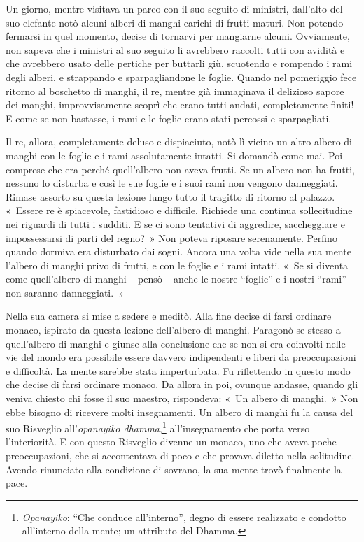 Un giorno, mentre visitava un parco con il suo seguito di ministri,
dall'alto del suo elefante notò alcuni alberi di manghi carichi di
frutti maturi. Non potendo fermarsi in quel momento, decise di tornarvi
per mangiarne alcuni. Ovviamente, non sapeva che i ministri al suo
seguito li avrebbero raccolti tutti con avidità e che avrebbero usato
delle pertiche per buttarli giù, scuotendo e rompendo i rami degli
alberi, e strappando e sparpagliandone le foglie. Quando nel pomeriggio
fece ritorno al boschetto di manghi, il re, mentre già immaginava il
delizioso sapore dei manghi, improvvisamente scoprì che erano tutti
andati, completamente finiti! E come se non bastasse, i rami e le foglie
erano stati percossi e sparpagliati.

Il re, allora, completamente deluso e dispiaciuto, notò lì vicino un
altro albero di manghi con le foglie e i rami assolutamente intatti. Si
domandò come mai. Poi comprese che era perché quell'albero non aveva
frutti. Se un albero non ha frutti, nessuno lo disturba e così le sue
foglie e i suoi rami non vengono danneggiati. Rimase assorto su questa
lezione lungo tutto il tragitto di ritorno al palazzo. «~Essere re è
spiacevole, fastidioso e difficile. Richiede una continua sollecitudine
nei riguardi di tutti i sudditi. E se ci sono tentativi di aggredire,
saccheggiare e impossessarsi di parti del regno?~» Non poteva riposare
serenamente. Perfino quando dormiva era disturbato dai sogni. Ancora una
volta vide nella sua mente l'albero di manghi privo di frutti, e con le
foglie e i rami intatti. «~Se si diventa come quell'albero di manghi --
pensò -- anche le nostre ``foglie'' e i nostri ``rami'' non saranno
danneggiati.~»

Nella sua camera si mise a sedere e meditò. Alla fine decise di farsi
ordinare monaco, ispirato da questa lezione dell'albero di manghi.
Paragonò se stesso a quell'albero di manghi e giunse alla conclusione
che se non si era coinvolti nelle vie del mondo era possibile essere
davvero indipendenti e liberi da preoccupazioni e difficoltà. La mente
sarebbe stata imperturbata. Fu riflettendo in questo modo che decise di
farsi ordinare monaco. Da allora in poi, ovunque andasse, quando gli
veniva chiesto chi fosse il suo maestro, rispondeva: «~Un albero di
manghi.~» Non ebbe bisogno di ricevere molti insegnamenti. Un albero di
manghi fu la causa del suo Risveglio all'\emph{opanayiko
dhamma},\footnote{\emph{Opanayiko}: ``Che conduce all'interno'', degno
  di essere realizzato e condotto all'interno della mente; un attributo
  del Dhamma.} all'insegnamento che porta verso l'interiorità. E con
questo Risveglio divenne un monaco, uno che aveva poche preoccupazioni,
che si accontentava di poco e che provava diletto nella solitudine.
Avendo rinunciato alla condizione di sovrano, la sua mente trovò
finalmente la pace.


